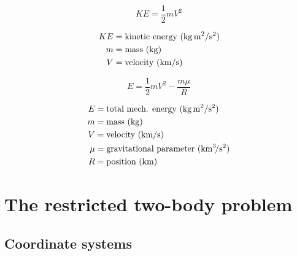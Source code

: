 \documentclass{article}
\begin{document}
\begin{multicols}{2}
	\begin{equation*}
	\boxed{KE = \dfrac{1}{2} m V^{2}}
	\end{equation*}
	
	\begin{align*}
	KE &= \text{kinetic energy (\si{\kilo\gram\,\meter\squared\per\second\squared)}}\\
	m &= \text{mass (\si{\kilo\gram})}\\
	V &= \text{velocity (\si{\kilo\meter\per\second}})\\
	\end{align*}
	
	\vfill\null
	\columnbreak
	
	\begin{equation*}
	\boxed{E = \dfrac{1}{2} m V^{2} - \dfrac{m\mu}{R}}
	\end{equation*}
	
	\begin{align*}
	E &= \text{total mech. energy (\si{\kilo\gram\,\meter\squared\per\second\squared)}}\\
	m &= \text{mass (\si{\kilo\gram})}\\
	V &= \text{velocity (\si{\kilo\meter\per\second}})\\
	\mu &= \text{gravitational parameter (\si{\kilo\meter\cubed\per\second\squared})}\\
	R &= \text{position (\si{\kilo\meter})}\\
	\end{align*}
	\vfill\null
\end{multicols}

\section{The restricted two-body problem}
\subsection{Coordinate systems}
\end{document}
